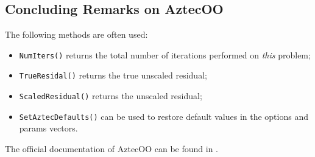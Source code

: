 
\subsection{Concluding Remarks on AztecOO}

The following methods are often used:
\begin{itemize}
\item \verb!NumIters()! returns the total number of iterations performed
  on {\sl this} problem;
\item \verb!TrueResidal()! returns the true unscaled residual;
\item \verb!ScaledResidual()! returns the unscaled residual;
\item \verb!SetAztecDefaults()! can be used to restore default values in
  the options and params vectors.
\end{itemize}

The official documentation of AztecOO can be found in
\cite{AztecOO-Users-Guide}.

